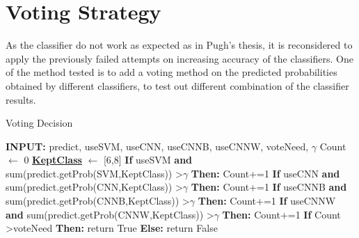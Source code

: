 \documentclass[bsc,logo,twoside,fullspacing,parskip]{infthesis}
\begin{document}



\section{Voting Strategy}
\label{sec:voting}

As the classifier do not work as expected as in Pugh's thesis, it is reconsidered to apply the previously failed attempts on increasing accuracy of the classifiers.
One of the method tested is to add a voting method on the predicted probabilities obtained by different classifiers, to test out different combination of the classifier results.




\begin{algorithm}
\caption{Voting Decision}
\begin{algorithmic}
\STATE \textbf{INPUT: } predict, useSVM, useCNN, useCNNB, useCNNW, voteNeed, $\gamma$
\STATE Count $\leftarrow$ 0
\STATE \underline{\textbf{KeptClass}} $\leftarrow$ [6,8]
\STATE \textbf{If} useSVM \textbf{and} sum(predict.getProb(SVM,KeptClass)) \textgreater  $\gamma$ \textbf{ Then:} Count+=1
\STATE \textbf{If} useCNN \textbf{and} sum(predict.getProb(CNN,KeptClass)) \textgreater  $\gamma$ \textbf{ Then:} Count+=1
\STATE \textbf{If} useCNNB \textbf{and} sum(predict.getProb(CNNB,KeptClass)) \textgreater  $\gamma$ \textbf{ Then:} Count+=1
\STATE \textbf{If} useCNNW \textbf{and} sum(predict.getProb(CNNW,KeptClass)) \textgreater  $\gamma$ \textbf{ Then:} Count+=1
\STATE \textbf{If} Count \textgreater voteNeed \textbf{ Then:} return True \textbf{ Else:} return False
\end{algorithmic} 
\end{algorithm}
\end{document}
